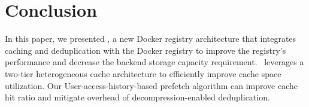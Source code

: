 \section{Conclusion}
\label{sec:conclusion}
In this paper, we presented \sysname, a new Docker registry architecture that integrates caching and deduplication with the Docker registry to
improve the registry's performance and decrease the backend storage capacity requirement. 
\sysname~leverages a two-tier heterogeneous cache architecture to efficiently improve cache space 
utilization. Our User-access-history-based prefetch algorithm can improve cache hit ratio and mitigate overhead of decompression-enabled deduplication.
